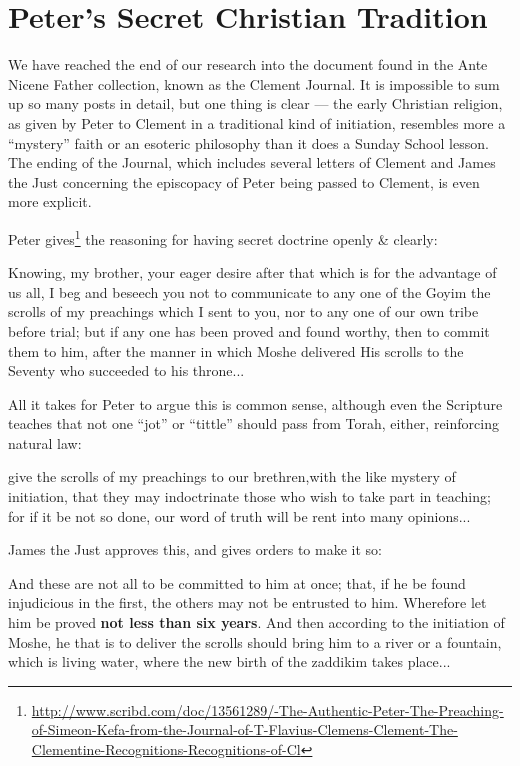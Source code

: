 \section{Peter’s Secret Christian Tradition}

We have reached the end of our research into the document found in the Ante Nicene Father collection, known as the Clement Journal. It is impossible to sum up so many posts in detail, but one thing is clear --- the early Christian religion, as given by Peter to Clement in a traditional kind of initiation, resembles more a ``mystery'' faith or an esoteric philosophy than it does a Sunday School lesson. The ending of the Journal, which includes several letters of Clement and James the Just concerning the episcopacy of Peter being passed to Clement, is even {more} explicit.

Peter gives\footnote{\url{http://www.scribd.com/doc/13561289/-The-Authentic-Peter-The-Preaching-of-Simeon-Kefa-from-the-Journal-of-T-Flavius-Clemens-Clement-The-Clementine-Recognitions-Recognitions-of-Cl}} the reasoning for having secret doctrine openly \& clearly:

\begin{quotex}
Knowing, my brother, your eager desire after that which is for the advantage of us all, I beg and beseech you not to communicate to any one of the Goyim the scrolls of my preachings which I sent to you, nor to any one of our own tribe before trial; but if any one has been proved and found worthy, then to commit them to him, after the manner in which Moshe delivered His scrolls to the Seventy who succeeded to his throne... 
\end{quotex}

All it takes for Peter to argue this is common sense, although even the Scripture teaches that not one ``jot'' or ``tittle'' should pass from Torah, either, reinforcing natural law:

\begin{quotex}
give the scrolls of my preachings to our brethren,with the like mystery of initiation, that they may indoctrinate those who wish to take part in teaching; for if it be not so done, our word of truth will be rent into many opinions... 
\end{quotex}

James the Just approves this, and gives orders to make it so:

\begin{quotex}
And these are not all to be committed to him at once; that, if he be found injudicious in the first, the others may not be entrusted to him. Wherefore let him be proved \textbf{not less than six years}. And then according to the initiation of Moshe, he that is to deliver the scrolls should bring him to a river or a fountain, which is living water, where the new birth of the zaddikim takes place... 
\end{quotex}


